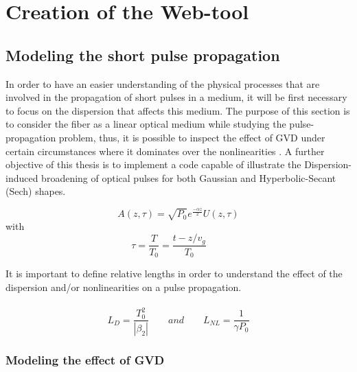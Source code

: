 \chapter{Creation of the Web-tool}

 \section{Modeling the short  pulse propagation}
    In order to have an easier understanding of the physical processes that are involved in the propagation of short pulses in a medium, it will be first necessary to focus on the dispersion that affects this medium. The purpose of this section is to consider the fiber as a linear optical medium while studying the pulse-propagation problem, thus, it is possible to inspect the effect of GVD under certain circumstances where it dominates over the nonlinearities \citep{ AgrawalBook}. A further objective of this thesis is to implement a code capable of illustrate the Dispersion-induced broadening of optical pulses for both Gaussian and Hyperbolic-Secant (Sech) shapes.

        
  
            \begin{equation}\label{eq_A0}
                A(z,\tau ) = \sqrt{P_0}e^{\frac{-\alpha z}{2}} U(z,\tau)
            \end{equation}
            with
            \begin{equation}
                \tau =  \frac{T}{T_0} = \frac{t-z/v_g}{T_0} \qquad
            \end{equation}
        
        It is important to define relative lengths in order to understand the effect of the dispersion and/or nonlinearities on a pulse propagation.
            \ \\
            \ \\
            \begin{equation}
                L_D = \frac{T^2_0}{|\beta_2|} \qquad and \qquad L_{NL} = \frac{1}{\gamma P_0}
            \end{equation}
 
        
        \subsection{Modeling the effect of GVD}
   
 
            
